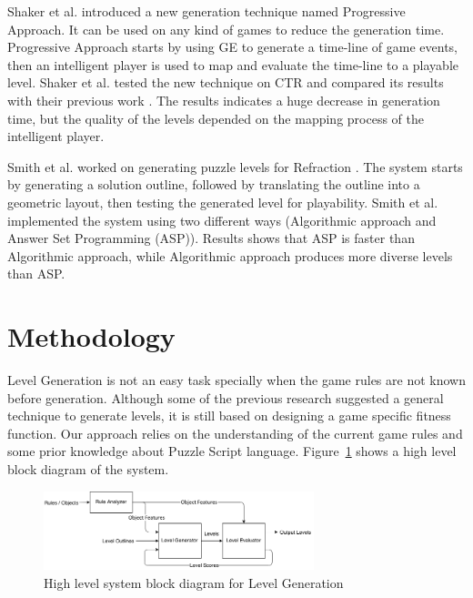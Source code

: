 \documentclass[letterpaper]{article}
\newcommand{\figref}[1]{Figure~\ref{Figure:#1}}
\begin{document}
Shaker et al. \cite{ctrProgressiveApproach} introduced a new generation technique named Progressive Approach. It can be used on any kind of games to reduce the generation time. Progressive Approach starts by using GE to generate a time-line of game events, then an intelligent player is used to map and evaluate the time-line to a playable level. Shaker et al. tested the new technique on CTR and compared its results with their previous work \cite{ctrSimulationApproach}. The results indicates a huge decrease in generation time, but the quality of the levels depended on the mapping process of the intelligent player.\\\par

Smith et al. \cite{refractionStudy} worked on generating puzzle levels for Refraction \citeauthor{refraction}. The system starts by generating a solution outline, followed by translating the outline into a geometric layout, then testing the generated level for playability. Smith et al. implemented the system using two different ways (Algorithmic approach and Answer Set Programming (ASP)). Results shows that ASP is faster than Algorithmic approach, while Algorithmic approach produces more diverse levels than ASP.

\section{Methodology}
Level Generation is not an easy task specially when the game rules are not known before generation. Although some of the previous research suggested a general technique to generate levels, it is still based on designing a game specific fitness function. Our approach relies on the understanding of the current game rules and some prior knowledge about Puzzle Script language. \figref{levelGenBlockDiagram} shows a high level block diagram of the system.\\\par

\begin{figure}[ht]
  	\centering
    \includegraphics[width=0.7\textwidth]{Images/levelGenBlockDiagram}
    \caption{High level system block diagram for Level Generation}
    \label{Figure:levelGenBlockDiagram}
\end{figure}
\end{document}
